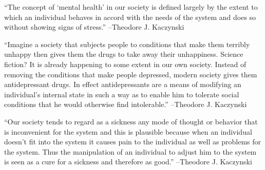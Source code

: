 \documentclass{article}%
\begin{document}
\linebreak%
\vspace{1mm}%
\begin{minipage}{\textwidth}%
\flushleft%
“The concept of ‘mental health’ in our society is defined largely by the extent to which an individual behaves in accord with the needs of the system and does so without showing signs of stress.”%
\linebreak%
\vspace{1mm}%
–Theodore J. Kaczynski%
\linebreak%
\vspace{1mm}%
\end{minipage}%
\linebreak%
\vspace{1mm}%
\begin{minipage}{\textwidth}%
\flushleft%
“Imagine a society that subjects people to conditions that make them terribly unhappy then gives them the drugs to take away their unhappiness. Science fiction? It is already happening to some extent in our own society. Instead of removing the conditions that make people depressed, modern society gives them antidepressant drugs. In effect antidepressants are a means of modifying an individual's internal state in such a way as to enable him to tolerate social conditions that he would otherwise find intolerable.”%
\linebreak%
\vspace{1mm}%
–Theodore J. Kaczynski%
\linebreak%
\vspace{1mm}%
\end{minipage}%
\linebreak%
\vspace{1mm}%
\begin{minipage}{\textwidth}%
\flushleft%
“Our society tends to regard as a sickness any mode of thought or behavior that is inconvenient for the system and this is plausible because when an individual doesn't fit into the system it causes pain to the individual as well as problems for the system. Thus the manipulation of an individual to adjust him to the system is seen as a cure for a sickness and therefore as good.”%
\linebreak%
\vspace{1mm}%
–Theodore J. Kaczynski%
\linebreak%
\vspace{1mm}%
\end{minipage}%
\linebreak%
\vspace{1mm}%
\end{document}
